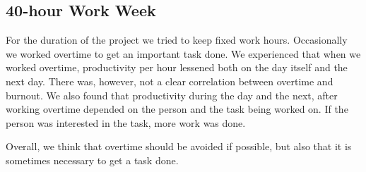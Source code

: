 \subsection{40-hour Work Week}
For the duration of the project we tried to keep fixed work hours. Occasionally we worked overtime to get an important task done. We experienced that when we worked overtime, productivity per hour lessened both on the day itself and the next day. There was, however, not a clear correlation between overtime and burnout. We also found that productivity during the day and the next, after working overtime depended on the person and the task being worked on. If the person was interested in the task, more work was done. 

Overall, we think that overtime should be avoided if possible, but also that it is sometimes necessary to get a task done.